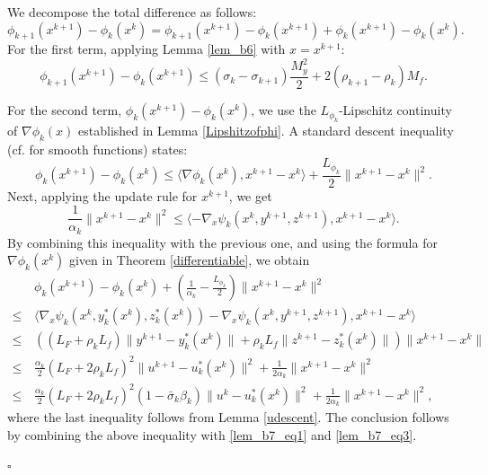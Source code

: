 \documentclass{article}
\newenvironment{proof}[1][Proof]{\par
	\normalfont\topsep6pt\relax
	\trivlist\item[\hskip\labelsep\itshape #1.]\ignorespaces
}{%
	\hfill\ensuremath{\square}\endtrivlist
}
\begin{document}
	 \begin{proof}
	 	We decompose the total difference as follows:
	 	\begin{equation}
	 		\phi_{k+1}(x^{k+1})-\phi_{k}(x^k)=\phi_{k+1}(x^{k+1})-\phi_{k}(x^{k+1}) + \phi_{k}(x^{k+1})-\phi_{k}(x^k).
	 	\end{equation}
For the first term, applying Lemma \ref{lem_b6} with $x = x^{k+1}$:
\begin{equation}\label{lem_b7_eq3}
    \phi_{k+1}(x^{k+1}) - \phi_{k}(x^{k+1}) \le \left( \sigma_k - \sigma_{k+1} \right)\frac{M_y^2 }{2} + 2\left(\rho_{k+1}-\rho_{k}\right)M_f.
\end{equation}
        
For the second term, $\phi_{k}(x^{k+1})-\phi_{k}(x^k)$, we use the $L_{\phi_k}$-Lipschitz continuity of $\nabla \phi_{k}(x)$ established in Lemma \ref{Lipshitzofphi}. A standard descent inequality (cf. \cite[Lemma 5.7]{beck2017first} for smooth functions) states:
\begin{equation}\label{lem_b7_eq1}
    \phi_{k}(x^{k+1})-\phi_{k}(x^k) \le \langle\nabla\phi_{k}(x^k),x^{k+1}-x^{k}\rangle+\frac{L_{\phi_k}}{2}\|x^{k+1}-x^{k}\|^2.
\end{equation}
Next, applying the update rule for $x^{k+1}$, we get
\[
\frac{1}{\alpha_k} \|x^{k+1}-x^{k}\|^2 \le \langle - \nabla_x\psi_{k}(x^k,y^{k+1},z^{k+1}),x^{k+1}-x^{k}\rangle.
\]
By combining this inequality with the previous one, and using the formula for $\nabla\phi_{k}(x^k)$ given in Theorem \ref{differentiable}, we obtain
\begin{equation}
    \begin{aligned}
         &\phi_{k}(x^{k+1})-\phi_{k}(x^k) + \left( \frac{1}{\alpha_k} - \frac{L_{\phi_k}}{2}\right) \|x^{k+1}-x^{k}\|^2 \\
        \le\,&\langle\nabla_x\psi_{k}(x^k,y_{k}^*(x^k),z_{k}^*(x^k)) - \nabla_x\psi_{k}(x^k,y^{k+1},z^{k+1}),x^{k+1}-x^{k}\rangle \\
        \le\, & \left( (L_F + \rho_k L_f) \| y^{k+1}- y_{k}^*(x^k)\| + \rho_k L_f \| z^{k+1}- z_{k}^*(x^k)\| \right) \| x^{k+1}-x^{k}\| \\
        \le\, & \frac{\alpha_k}{2} (L_F + 2\rho_k L_f)^2\| u^{k+1}- u_{k}^*(x^k)\|^2 + \frac{1}{2\alpha_k} \| x^{k+1}-x^{k}\|^2 \\
        \le\, &\frac{\alpha_k}{2} (L_F + 2\rho_k L_f)^2 (1-\bar{\sigma}_k \beta_k) \| u^{k}- u_{k}^*(x^k)\|^2 + \frac{1}{2\alpha_k} \| x^{k+1}-x^{k}\|^2, 
    \end{aligned}
\end{equation}
where the last inequality follows from Lemma \ref{udescent}. The conclusion follows by combining the above inequality with \eqref{lem_b7_eq1} and \eqref{lem_b7_eq3}.
	
	 \end{proof}
\end{document}
